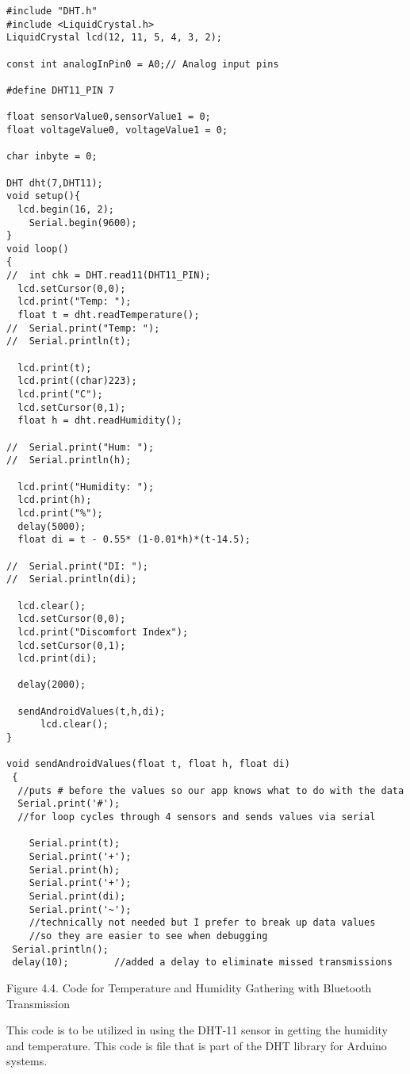 \begin{lstlisting}
#include "DHT.h"
#include <LiquidCrystal.h>
LiquidCrystal lcd(12, 11, 5, 4, 3, 2);

const int analogInPin0 = A0;// Analog input pins

#define DHT11_PIN 7

float sensorValue0,sensorValue1 = 0;
float voltageValue0, voltageValue1 = 0;

char inbyte = 0;

DHT dht(7,DHT11);
void setup(){
  lcd.begin(16, 2);
    Serial.begin(9600);
}
void loop()
{
//  int chk = DHT.read11(DHT11_PIN);
  lcd.setCursor(0,0); 
  lcd.print("Temp: ");
  float t = dht.readTemperature();
//  Serial.print("Temp: ");
//  Serial.println(t);
  
  lcd.print(t);
  lcd.print((char)223);
  lcd.print("C");
  lcd.setCursor(0,1);
  float h = dht.readHumidity();

//  Serial.print("Hum: ");
//  Serial.println(h);
  
  lcd.print("Humidity: ");
  lcd.print(h);
  lcd.print("%");
  delay(5000);
  float di = t - 0.55* (1-0.01*h)*(t-14.5);

//  Serial.print("DI: ");
//  Serial.println(di);

  lcd.clear();
  lcd.setCursor(0,0);
  lcd.print("Discomfort Index");
  lcd.setCursor(0,1);
  lcd.print(di);

  delay(2000);
  
  sendAndroidValues(t,h,di);
      lcd.clear();
}

void sendAndroidValues(float t, float h, float di)
 {
  //puts # before the values so our app knows what to do with the data
  Serial.print('#');
  //for loop cycles through 4 sensors and sends values via serial
  
    Serial.print(t);
    Serial.print('+');
    Serial.print(h);
    Serial.print('+');
    Serial.print(di);
    Serial.print('~');
    //technically not needed but I prefer to break up data values
    //so they are easier to see when debugging
 Serial.println();
 delay(10);        //added a delay to eliminate missed transmissions

\end{lstlisting}


\begin{center}
Figure 4.4. Code for Temperature and Humidity Gathering with Bluetooth Transmission
\end{center}


This code is to be utilized in using the DHT-11 sensor in getting the humidity and temperature. This code is file that is part of the DHT library for Arduino systems.

